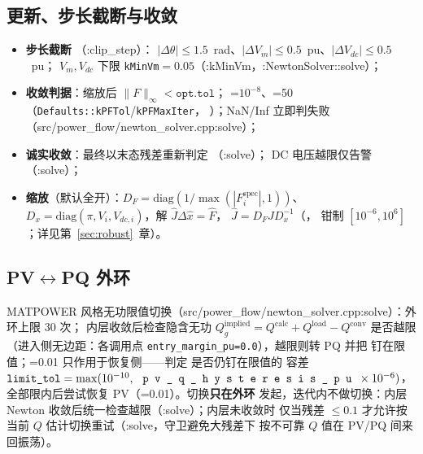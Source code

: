 \subsection{更新、步长截断与收敛}
\begin{itemize}
  \item \textbf{步长截断} （:clip\_step）：
        $|\Delta\theta|\le 1.5$~rad、$|\Delta V_m|\le 0.5$~pu、$|\Delta V_{dc}|\le 0.5$~pu；
        $V_m,V_{dc}$ 下限 \texttt{kMinVm}$=0.05$（:kMinVm，:NewtonSolver::solve）；
  \item \textbf{收敛判据}：缩放后 $\lVert F\rVert_\infty<\texttt{opt.tol}$；
        =$10^{-8}$、=50（\texttt{Defaults::kPFTol}/\texttt{kPFMaxIter}，
        ）；NaN/Inf 立即判失败（src/power\_flow/newton\_solver.cpp:solve）；
  \item \textbf{诚实收敛}：最终以末态残差重新判定 （:solve）；
        DC 电压越限仅告警（:solve）；
  \item \textbf{缩放}（默认全开）：$D_F=\mathrm{diag}(1/\max(|F_i^{\mathrm{spec}}|,1))$、
        $D_x=\mathrm{diag}(\pi,V_i,V_{dc,i})$，解 $\hat J\Delta\hat x=\hat F$，
        $\hat J=D_FJD_x^{-1}$（，
        钳制 $[10^{-6},10^6]$；详见第~\ref{sec:robust}~章）。
\end{itemize}

\subsection{PV$\leftrightarrow$PQ 外环}
MATPOWER 风格无功限值切换（src/power\_flow/newton\_solver.cpp:solve）：外环上限 30 次；
内层收敛后检查隐含无功 $Q_g^{\mathrm{implied}}=Q^{\mathrm{calc}}+Q^{\mathrm{load}}-Q^{\mathrm{conv}}$
是否越限（进入侧无边距：各调用点 \texttt{entry\_margin\_pu=0.0}），越限则转 PQ 并把 
钉在限值；=0.01 只作用于恢复侧——判定  是否仍钉在限值的
容差 $\texttt{limit\_tol}=\max(10^{-10},\,\fld{pv\_q\_hysteresis\_pu}\times10^{-6})$，
全部限内后尝试恢复 PV（=0.01）。切换\textbf{只在外环}
发起，迭代内不做切换：内层 Newton 收敛后统一检查越限（:solve）；内层未收敛时
仅当残差 $\le 0.1$ 才允许按当前 $Q$ 估计切换重试（:solve，守卫避免大残差下
按不可靠 $Q$ 值在 PV/PQ 间来回振荡）。

